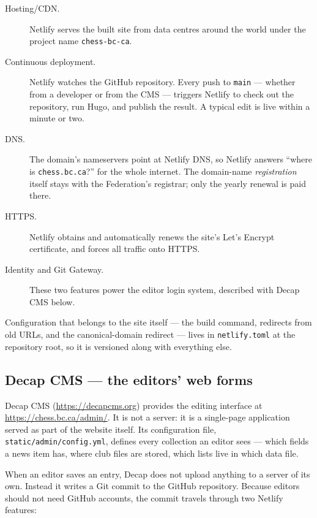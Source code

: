 \documentclass[12pt,letterpaper]{article}
\begin{document}
\begin{description}
  \item[Hosting/CDN.] Netlify serves the built site from data centres
  around the world under the project name \texttt{chess-bc-ca}.

  \item[Continuous deployment.] Netlify watches the GitHub repository.
  Every push to \texttt{main} --- whether from a developer or from the CMS
  --- triggers Netlify to check out the repository, run Hugo, and publish
  the result. A typical edit is live within a minute or two.

  \item[DNS.] The domain's nameservers point at Netlify DNS, so Netlify
  answers ``where is \texttt{chess.bc.ca}?'' for the whole internet. The
  domain-name \emph{registration} itself stays with the Federation's
  registrar; only the yearly renewal is paid there.

  \item[HTTPS.] Netlify obtains and automatically renews the site's
  Let's Encrypt certificate, and forces all traffic onto HTTPS.

  \item[Identity and Git Gateway.] These two features power the editor
  login system, described with Decap CMS below.
\end{description}

Configuration that belongs to the site itself --- the build command,
redirects from old URLs, and the canonical-domain redirect --- lives in
\texttt{netlify.toml} at the repository root, so it is versioned along with
everything else.

\subsection{Decap CMS --- the editors' web forms}

Decap CMS (\url{https://decapcms.org}) provides the editing interface at
\url{https://chess.bc.ca/admin/}. It is not a server: it is a single-page
application served as part of the website itself. Its configuration file,
\texttt{static/admin/config.yml}, defines every collection an editor sees
--- which fields a news item has, where club files are stored, which lists
live in which data file.

When an editor saves an entry, Decap does not upload anything to a server of
its own. Instead it writes a Git commit to the GitHub repository. Because
editors should not need GitHub accounts, the commit travels through two
Netlify features:
\end{document}
